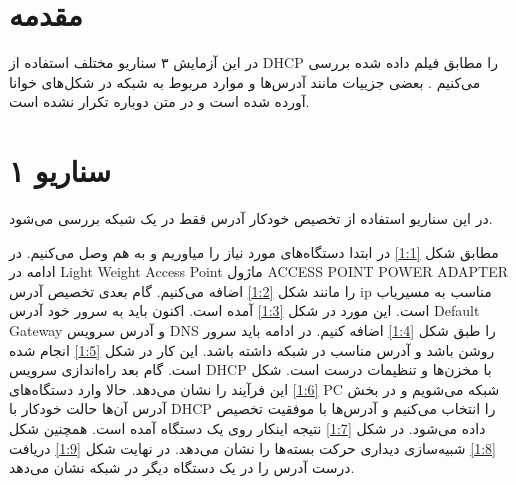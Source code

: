 \documentclass[12pt]{article}
\begin{document}
	\section{مقدمه}
	در این آزمایش ۳ سناریو مختلف استفاده از \textenglish{DHCP} را مطابق فیلم داده شده بررسی می‌کنیم \cite{a1}. بعضی جزییات مانند آدرس‌ها و موارد مربوط به شبکه در شکل‌های خوانا آورده شده است و در متن دوباره تکرار نشده است.
	
	\section{سناریو ۱}
	در این سناریو استفاده از تخصیص خودکار آدرس فقط در یک شبکه بررسی می‌شود.
	
	مطابق شکل \ref{1:1} در ابتدا دستگاه‌های مورد نیاز را میاوریم و به هم وصل می‌کنیم. در ادامه در \textenglish{Light Weight Access Point} ماژول \textenglish{ACCESS POINT POWER ADAPTER} را مانند شکل \ref{1:2} اضافه می‌کنیم. گام بعدی تخصیص آدرس \textenglish{ip} مناسب به مسیریاب است. این مورد در شکل \ref{1:3} آمده است. اکنون باید به سرور خود آدرس \textenglish{Default Gateway} و آدرس سرویس \textenglish{DNS} را طبق شکل \ref{1:4} اضافه کنیم. در ادامه باید سرور روشن باشد و آدرس مناسب در شبکه داشته باشد. این کار در شکل \ref{1:5} انجام شده است. گام بعد راه‌اندازی سرویس \textenglish{DHCP} با مخزن‌ها و تنظیمات درست است. شکل \ref{1:6} این فرآیند را نشان می‌دهد. حالا وارد دستگاه‌های \textenglish{PC} شبکه می‌شویم و در بخش آدرس آن‌ها حالت خودکار با \textenglish{DHCP} را انتخاب می‌کنیم و آدرس‌ها با موفقیت تخصیص داده می‌شود. در شکل \ref{1:7} نتیجه اینکار روی یک دستگاه آمده است. همچنین شکل \ref{1:8} شبیه‌سازی دیداری حرکت بسته‌ها را نشان می‌دهد. در نهایت شکل \ref{1:9} دریافت درست آدرس را در یک دستگاه دیگر در شبکه نشان می‌دهد.
	
\end{document}
